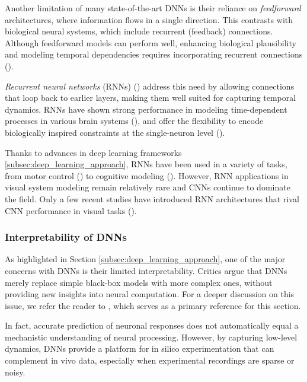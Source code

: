 Another limitation of many state-of-the-art DNNs is their reliance on \emph{feedforward} architectures, where information flows in a single direction. This contrasts with biological neural systems, which include recurrent (feedback) connections. Although feedforward models can perform well, enhancing biological plausibility and modeling temporal dependencies requires incorporating recurrent connections (\citet{Kafaligonul2015rnn, shou2010functional, kar2019evidence}).

\emph{Recurrent neural networks} (RNNs) (\citet{medsker2001recurrent}) address this need by allowing connections that loop back to earlier layers, making them well suited for capturing temporal dynamics. RNNs have shown strong performance in modeling time-dependent processes in various brain systems (\citet{mante2013context, song2016excinhrec}), and offer the flexibility to encode biologically inspired constraints at the single-neuron level (\citet{mante2013context, masse2019circuit, kim2019rnnframework}).

Thanks to advances in deep learning frameworks \ref{subsec:deep_learning_approach}, RNNs have been used in a variety of tasks, from motor control (\citet{sussillo2015neural, saxena2022motor}) to cognitive modeling (\citet{masse2019circuit, goudar2023schema}). However, RNN applications in visual system modeling remain relatively rare and CNNs continue to dominate the field. Only a few recent studies have introduced RNN architectures that rival CNN performance in visual tasks (\citet{NEURIPS2024_f536d569}).

\subsubsection{Interpretability of DNNs}
\label{subsubsec:interpretability_dnn}

As highlighted in Section \ref{subsec:deep_learning_approach}, one of the major concerns with DNNs is their limited interpretability. Critics argue that DNNs merely replace simple black-box models with more complex ones, without providing new insights into neural computation. For a deeper discussion on this issue, we refer the reader to \citet{Kriegeskorte2015dnn}, which serves as a primary reference for this section.

In fact, accurate prediction of neuronal responses does not automatically equal a mechanistic understanding of neural processing. However, by capturing low-level dynamics, DNNs provide a platform for in silico experimentation that can complement in vivo data, especially when experimental recordings are sparse or noisy.

